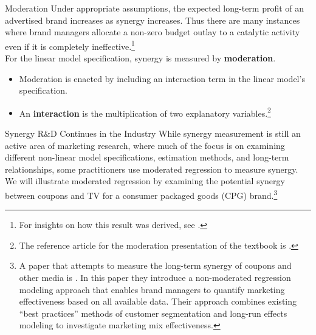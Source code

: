 \documentclass[pdf]{beamer}
\newcommand{\empr}[1]{{\color{franklinblue}\textbf{#1}}}
\theoremstyle{remark}
\theoremstyle{definition}
\begin{document}
\begin{frame}[t]{Moderation}
Under appropriate assumptions, the expected long-term profit of an advertised brand increases as synergy increases. Thus there are many instances where brand managers allocate a non-zero budget outlay to a catalytic activity even if it is completely ineffective.\footnote{For insights on how this result was derived, see \cite{raman2004}.}\\
\vspace{1.5ex}
For the linear model specification, synergy is measured by \empr{moderation}.  \\
\small
\begin{itemize}
  \item Moderation is enacted by including an interaction term in the linear model's specification. 
  \item An \empr{interaction} is the multiplication of two explanatory variables.\footnote{The reference article for the moderation presentation of the textbook is \cite{spiller2013}.} 
\end{itemize}
\end{frame}

\begin{frame}[t]{Synergy R\&D Continues in the Industry}
While synergy measurement is still an active area of marketing research, where much of the focus is on examining different non-linear model specifications, estimation methods, and long-term relationships, some practitioners use moderated regression to measure synergy. \\
\vspace{1.5ex}
We will illustrate moderated regression by examining the potential synergy between coupons and TV for a consumer packaged goods (CPG) brand.\footnote{A paper that attempts to measure the long-term synergy of coupons and other media is \cite{reimer2014}.  In this paper they introduce a non-moderated regression modeling approach that enables brand managers to quantify marketing effectiveness based on all available data. Their approach combines existing ``best practices'' methods of customer segmentation and long-run effects modeling to investigate marketing mix effectiveness.} 
\end{frame}
\end{document}
